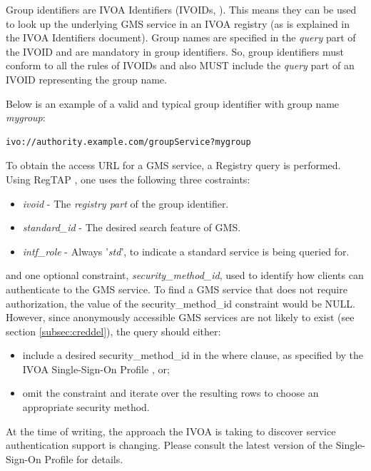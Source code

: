 \documentclass[11pt,a4paper]{ivoa}
\begin{document}
Group identifiers are IVOA Identifiers (IVOIDs, \citet{2016ivoa.spec.0523D}).  This means they can be used to look up the underlying GMS service in an IVOA registry (as is explained in the IVOA Identifiers document).  Group names are specified in the \emph{query} part of the IVOID and are mandatory in group identifiers.  So, group identifiers must conform to all the rules of IVOIDs and also MUST include the \emph{query} part of an IVOID representing the group name.

Below is an example of a valid and typical group identifier with group name \emph{mygroup}:

\begin{verbatim}
ivo://authority.example.com/groupService?mygroup
\end{verbatim}

To obtain the access URL for a GMS service, a Registry query is performed. Using RegTAP \citep{2014ivoa.spec.1208D}, one uses the following three costraints:

\begin{itemize}
\item{\emph{ivoid}} - The \emph{registry part} of the group identifier.
\item{\emph{standard\_id}} - The desired search feature of GMS.
\item{\emph{intf\_role}} - Always '\emph{std}', to indicate a standard service is being queried for.
\end{itemize}

and one optional constraint, \emph{security\_method\_id}, used to identify how clients can authenticate to the GMS service.  To find a GMS service that does not require authorization, the value of the security\_method\_id constraint would be NULL.  However, since anonymously accessible GMS services are not likely to exist (see section \ref{subsec:creddel}), the query should either:

\begin{itemize}
\item include a desired security\_method\_id in the where clause, as specified by the IVOA Single-Sign-On Profile \citep{2017ivoa.spec.0524T}, or;
\item omit the constraint and iterate over the resulting rows to choose an appropriate security method.
\end{itemize}

At the time of writing, the approach the IVOA is taking to discover service authentication support is changing.  Please consult the latest version of the Single-Sign-On Profile for details.
\end{document}
